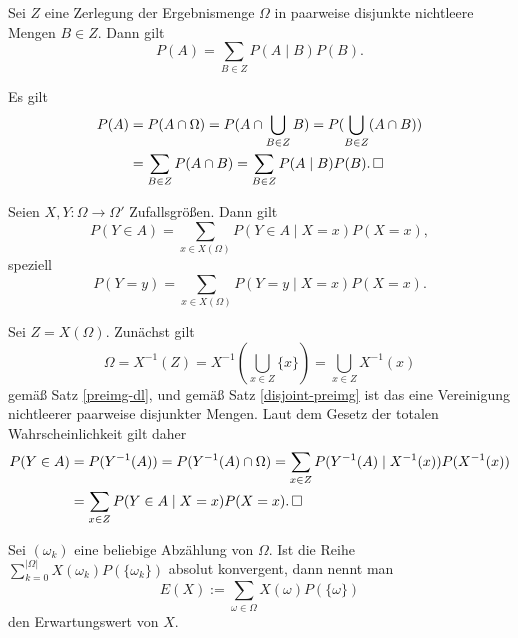 \begin{Satz}%
Sei $Z$ eine Zerlegung der Ergebnismenge
$\Omega$ in paarweise disjunkte nichtleere Mengen $B\in Z$. Dann gilt
\[P(A) = \sum_{B\in Z} P(A\mid B)P(B).\]
\end{Satz}

\begin{Beweis}
Es gilt
\begin{align*}
P(A) &= P(A\cap\Omega) = P(A\cap\bigcup_{B\in Z} B)
= P(\bigcup_{B\in Z} (A\cap B))\\
&= \sum_{B\in Z} P(A\cap B)
= \sum_{B\in Z} P(A\mid B)P(B).\,\square
\end{align*}
\end{Beweis}

\begin{Satz}%
\label{total-prob-rv}\newlinefirst
Seien $X,Y\colon\Omega\to\Omega'$ Zufallsgrößen. Dann gilt%
\[P(Y\in A) = \sum_{x\in X(\Omega)} P(Y\in A\mid X=x)P(X=x),\]
speziell
\[P(Y=y) = \sum_{x\in X(\Omega)} P(Y=y\mid X=x)P(X=x).\]
\end{Satz}

\begin{Beweis}
Sei $Z=X(\Omega)$. Zunächst gilt
\[\Omega = X^{-1}(Z) = X^{-1}(\bigcup_{x\in Z} \{x\})
= \bigcup_{x\in Z} X^{-1}(x)\]
gemäß Satz \ref{preimg-dl}, und gemäß Satz
\ref{disjoint-preimg} ist das eine Vereinigung nichtleerer
paarweise disjunkter Mengen. Laut dem Gesetz der totalen
Wahrscheinlichkeit gilt daher%
\begin{align*}
P(Y\in A) &= P(Y^{-1}(A)) = P(Y^{-1}(A)\cap\Omega)
= \sum_{x\in Z} P(Y^{-1}(A)\mid X^{-1}(x))P(X^{-1}(x))\\
&= \sum_{x\in Z} P(Y\in A\mid X=x)P(X=x).\,\square
\end{align*}
\end{Beweis}

\begin{Definition}[Erwartungswert]%
\label{def:expected-value}\newlinefirst
Sei $(\omega_k)$ eine beliebige Abzählung von $\Omega$.
Ist die Reihe $\sum_{k=0}^{|\Omega|} X(\omega_k)P(\{\omega_k\})$
absolut konvergent, dann nennt man%
\[E(X) := \sum_{\omega\in\Omega} X(\omega)P(\{\omega\})\]
den Erwartungswert von $X$.
\end{Definition}

